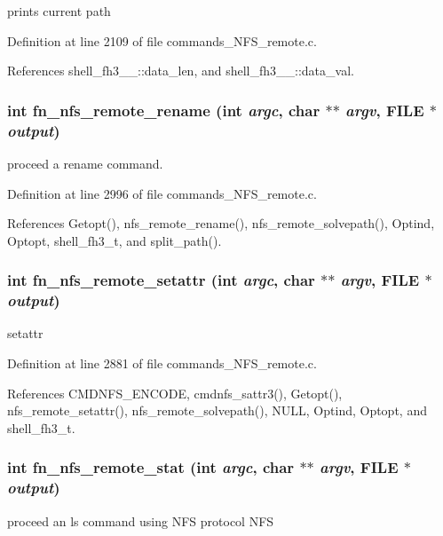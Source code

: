 prints current path 

Definition at line 2109 of file commands\_\-NFS\_\-remote.c.

References shell\_\-fh3\_\-\_\-::data\_\-len, and shell\_\-fh3\_\-\_\-::data\_\-val.
\subsubsection{\setlength{\rightskip}{0pt plus 5cm}int fn\_\-nfs\_\-remote\_\-rename (int {\em argc}, char $\ast$$\ast$ {\em argv}, FILE $\ast$ {\em output})}\label{commands_8h_a95}


proceed a rename command. 

Definition at line 2996 of file commands\_\-NFS\_\-remote.c.

References Getopt(), nfs\_\-remote\_\-rename(), nfs\_\-remote\_\-solvepath(), Optind, Optopt, shell\_\-fh3\_\-t, and split\_\-path().
\subsubsection{\setlength{\rightskip}{0pt plus 5cm}int fn\_\-nfs\_\-remote\_\-setattr (int {\em argc}, char $\ast$$\ast$ {\em argv}, FILE $\ast$ {\em output})}\label{commands_8h_a94}


setattr 

Definition at line 2881 of file commands\_\-NFS\_\-remote.c.

References CMDNFS\_\-ENCODE, cmdnfs\_\-sattr3(), Getopt(), nfs\_\-remote\_\-setattr(), nfs\_\-remote\_\-solvepath(), NULL, Optind, Optopt, and shell\_\-fh3\_\-t.
\subsubsection{\setlength{\rightskip}{0pt plus 5cm}int fn\_\-nfs\_\-remote\_\-stat (int {\em argc}, char $\ast$$\ast$ {\em argv}, FILE $\ast$ {\em output})}\label{commands_8h_a98}


proceed an ls command using NFS protocol NFS 

